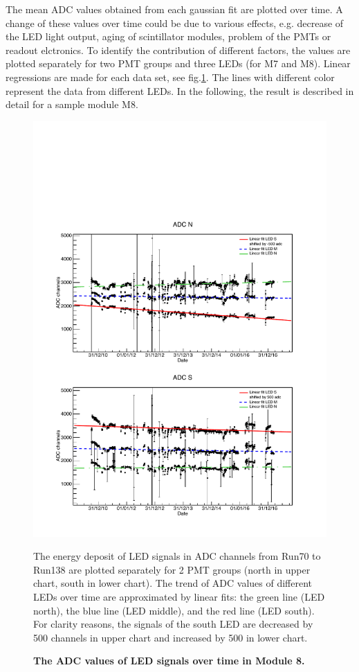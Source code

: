The mean ADC values obtained from each gaussian fit are plotted over time. A change of these values over time could be due to various effects, e.g. decrease of the LED light output, aging of scintillator modules, problem of the PMTs or readout elctronics. To identify the contribution of different factors, the values are plotted separately for two PMT groups and three LEDs (for M7 and M8). Linear regressions are made for each data set, see fig.\ref{fig:M8LED}. The lines with different color represent the data from different LEDs. In the following, the result is described in detail for a sample module M8.

\begin{figure}[htbp]
  \centering
  \includegraphics[width=\textwidth{}]{./fig/M8LED.pdf}
  \caption{\textbf{The ADC values of LED signals over time in Module 8.}} The energy deposit of LED signals in ADC channels from Run70 to Run138 are plotted separately for 2 PMT groups (north in upper chart, south in lower chart). The trend of ADC values of different LEDs over time are approximated by linear fits: the green line (LED north), the blue line (LED middle), and the red line (LED south). For clarity reasons, the signals of the south LED are decreased by 500 channels in upper chart and increased by 500 in lower chart.
  \label{fig:M8LED}
\end{figure}


